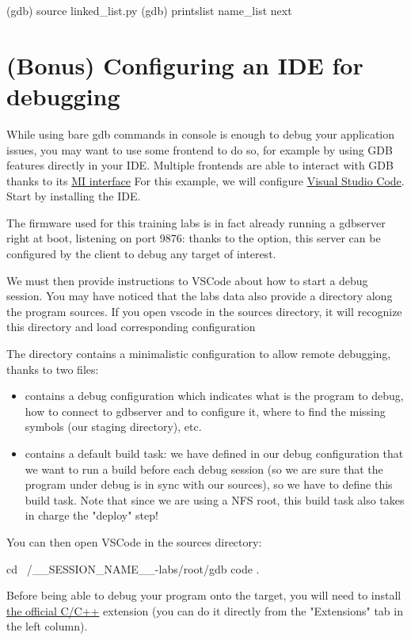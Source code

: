 \begin{bashinput}
(gdb) source linked_list.py
(gdb) printslist name_list next
\end{bashinput}

\section{(Bonus) Configuring an IDE for debugging}

While using bare gdb commands in console is enough to debug your application issues, you
may want to use some frontend to do so, for example by using GDB features directly
in your IDE. Multiple frontends are able to interact with GDB thanks to its
\href{https://sourceware.org/gdb/current/onlinedocs/gdb.html/GDB_002fMI.html}{MI
interface}
For this example, we will configure
\href{https://code.visualstudio.com/}{Visual Studio Code}. Start by installing
the IDE.

The firmware used for this training labs is in fact already running a gdbserver
right at boot, listening on port 9876: thanks to the  option,
this server can be configured by the client to debug any target of interest.

We must then provide instructions to VSCode about how to start a debug session.
You may have noticed that the labs data also provide a  directory
along the program sources. If you open vscode in the sources directory, it will
recognize this  directory and load corresponding configuration

The  directory contains a minimalistic configuration to allow
remote debugging, thanks to two files:
\begin{itemize}
  \item {} contains a debug configuration which indicates what
  is the program to debug, how to connect to gdbserver and to configure it, where to
  find the missing symbols (our staging directory), etc.
  \item {} contains a default build task: we have defined in our
  debug configuration that we want to run a build before each debug session (so
  we are sure that the program under debug is in sync with our sources), so
  we have to define this build task. Note that since we are using a NFS root,
  this build task also takes in charge the "deploy" step!
\end{itemize}

You can then open VSCode in the sources directory:
\begin{bashinput}
  cd ~/__SESSION_NAME__-labs/root/gdb
  code .
\end{bashinput}
Before being able to debug your program onto the target, you will need to install
\href{https://marketplace.visualstudio.com/items?itemName=ms-vscode.cpptools}{the
official C/C++} extension (you can do it directly from the "Extensions" tab in
the left column).


